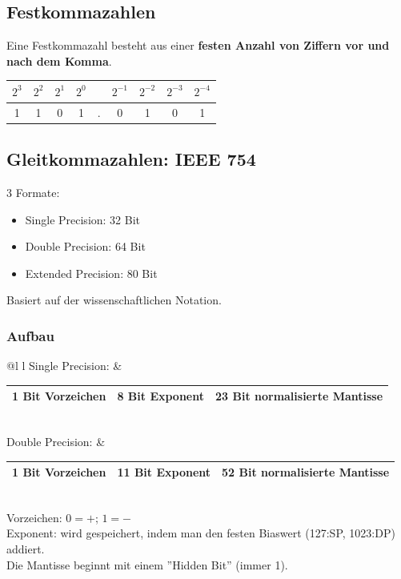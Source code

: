 \documentclass[12pt]{article}
\begin{document}
\subsection{Festkommazahlen}
Eine Festkommazahl besteht aus einer \textbf{festen Anzahl von Ziffern vor und nach dem Komma}.\\ \newline
\begin{tabular}{c|c|c|c|c|c|c|c|c}
    $2^3$ & $2^2$ & $2^1$ & $2^0$ &  & $2^{-1}$ & $2^{-2}$ & $2^{-3}$ & $2^{-4}$ \\ \hline
    1 & 1 & 0 & 1 & . & 0 & 1 & 0 &1
\end{tabular}
\subsection{Gleitkommazahlen: IEEE 754}
3 Formate:
\begin{itemize}
    \item Single Precision: 32 Bit
    \item Double Precision: 64 Bit
    \item Extended Precision: 80 Bit
\end{itemize}
Basiert auf der wissenschaftlichen Notation.
\subsubsection{Aufbau}
\begin{tabular}{@{}l l}
    Single Precision: &
    \begin{tabular}{|c|c|c|}
        \hline
        1 Bit Vorzeichen & 8 Bit Exponent & 23 Bit normalisierte Mantisse\\
        \hline
    \end{tabular} \\
    Double Precision: &
    \begin{tabular}{|c|c|c|}
        \hline
        1 Bit Vorzeichen & 11 Bit Exponent & 52 Bit normalisierte Mantisse\\
        \hline
    \end{tabular}
\end{tabular} \\
\newline
Vorzeichen: $0 = +$; $1 = -$ \\
\newline
Exponent: wird gespeichert, indem man den festen Biaswert (127:SP, 1023:DP) addiert. \\
\newline
Die Mantisse beginnt mit einem ''Hidden Bit'' (immer 1).
\end{document}
